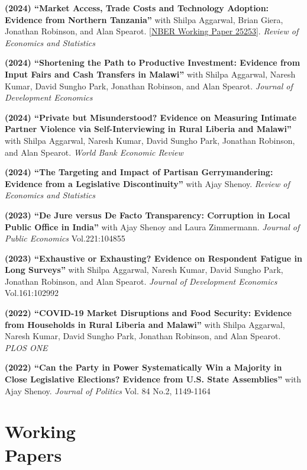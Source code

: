 \documentclass[letterpaper, margin, 10pt]{res} %
\begin{document}
\begin{resume}
{\bf (2024) ``{Market Access, Trade Costs and Technology Adoption: Evidence from Northern Tanzania}''} with Shilpa Aggarwal, Brian Giera, Jonathan Robinson, and Alan Spearot. \href{https://www.nber.org/papers/w25253.pdf}{[NBER Working Paper 25253]}. \textit{Review of Economics and Statistics}

{\bf (2024) ``{Shortening the Path to Productive Investment: Evidence from Input Fairs and Cash Transfers in Malawi}''}
with Shilpa Aggarwal, Naresh Kumar, David Sungho Park, Jonathan Robinson, and Alan Spearot. \textit{Journal of Development Economics}

{\bf (2024) ``Private but Misunderstood? Evidence on Measuring Intimate Partner Violence via Self-Interviewing in Rural Liberia and Malawi''}
with Shilpa Aggarwal, Naresh Kumar, David Sungho Park, Jonathan Robinson, and Alan Spearot. \textit{World Bank Economic Review}


{\bf (2024) ``{The Targeting and Impact of Partisan Gerrymandering: Evidence from a Legislative Discontinuity}''} with Ajay Shenoy. \textit{Review of Economics and Statistics} 


{\bf (2023) ``De Jure versus De Facto Transparency: Corruption in Local Public Office in India''} 
with Ajay Shenoy and Laura Zimmermann. \textit{Journal of Public Economics} Vol.221:104855


{\bf (2023) ``Exhaustive or Exhausting? Evidence on Respondent Fatigue in Long Surveys''}
with Shilpa Aggarwal, Naresh Kumar, David Sungho Park, Jonathan Robinson, and Alan Spearot. \textit{Journal of Development Economics} Vol.161:102992


{\bf (2022) ``COVID-19 Market Disruptions and Food Security: Evidence from Households in Rural Liberia and Malawi''} with Shilpa Aggarwal, Naresh Kumar, David Sungho Park, Jonathan Robinson, and Alan Spearot. \textit{PLOS ONE}


{\bf  (2022) ``{Can the Party in Power Systematically Win a Majority in Close Legislative Elections? Evidence from U.S. State Assemblies}''} with Ajay Shenoy. \textit{Journal of Politics} Vol. 84 No.2, 1149-1164



\normalsize\section{\textbf{Working \\ Papers}}

\normalsize 


\normalsize 





\end{resume}
\end{document}
